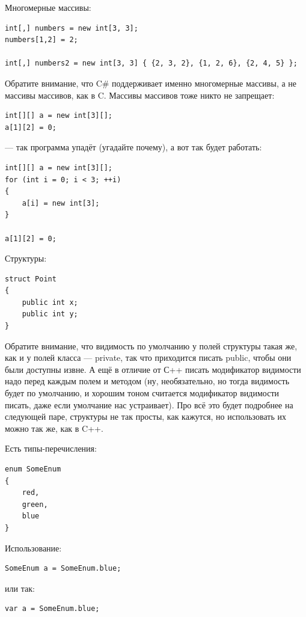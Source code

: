 \documentclass[a5paper]{article}
\begin{document}
Многомерные массивы:

\begin{verbatim}
int[,] numbers = new int[3, 3];
numbers[1,2] = 2;
 
int[,] numbers2 = new int[3, 3] { {2, 3, 2}, {1, 2, 6}, {2, 4, 5} };
\end{verbatim}

Обратите внимание, что C\# поддерживает именно многомерные массивы, а не массивы массивов, как в C. Массивы массивов тоже никто не запрещает:

\begin{verbatim}
int[][] a = new int[3][];
a[1][2] = 0;
\end{verbatim}

--- так программа упадёт (угадайте почему), а вот так будет работать:

\begin{verbatim}
int[][] a = new int[3][];
for (int i = 0; i < 3; ++i)
{
    a[i] = new int[3];
}

a[1][2] = 0;
\end{verbatim}

Структуры:

\begin{verbatim}
struct Point
{
    public int x;
    public int y;
}
\end{verbatim}

Обратите внимание, что видимость по умолчанию у полей структуры такая же, как и у полей класса --- private, так что приходится писать public, чтобы они были доступны извне. А ещё в отличие от С++ писать модификатор видимости надо перед каждым полем и методом (ну, необязательно, но тогда видимость будет по умолчанию, и хорошим тоном считается модификатор видимости писать, даже если умолчание нас устраивает). Про всё это будет подробнее на следующей паре, структуры не так просты, как кажутся, но использовать их можно так же, как в C++.

Есть типы-перечисления:

\begin{verbatim}
enum SomeEnum
{
    red,
    green,
    blue
}
\end{verbatim}

Использование:

\begin{verbatim}
SomeEnum a = SomeEnum.blue;
\end{verbatim}

или так:

\begin{verbatim}
var a = SomeEnum.blue;
\end{verbatim}
\end{document}
